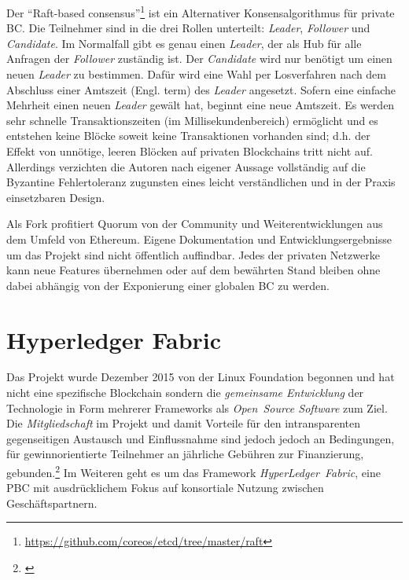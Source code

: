 
Der \enquote{Raft-based consensus}\footnote{\url{https://github.com/coreos/etcd/tree/master/raft}} ist ein Alternativer Konsensalgorithmus für private \gls{BC}. Die Teilnehmer sind in die drei Rollen unterteilt:
\emph{Leader}, \emph{Follower} und \emph{Candidate}. Im Normalfall gibt es genau einen \emph{Leader}, der als Hub für alle Anfragen der \emph{Follower} zuständig ist.
Der \emph{Candidate} wird nur benötigt um einen neuen \emph{Leader} zu bestimmen.
Dafür wird eine Wahl per Losverfahren nach dem Abschluss einer Amtszeit (Engl. term) des \emph{Leader} angesetzt.
Sofern eine einfache Mehrheit einen neuen \emph{Leader} gewält hat, beginnt eine neue Amtszeit.
Es werden sehr schnelle Transaktionszeiten (im Millisekundenbereich) ermöglicht und es entstehen keine Blöcke soweit keine Transaktionen vorhanden sind;
d.h. der Effekt von unnötige, leeren Blöcken auf privaten Blockchains tritt nicht auf.
Allerdings verzichten die Autoren nach eigener Aussage vollständig auf die Byzantine Fehlertoleranz zugunsten eines leicht verständlichen und in der Praxis einsetzbaren Design. 

Als Fork profitiert Quorum von der Community und Weiterentwicklungen aus dem Umfeld von Ethereum.
Eigene Dokumentation und Entwicklungsergebnisse um das Projekt sind nicht öffentlich auffindbar. 
Jedes der privaten Netzwerke kann neue Features übernehmen oder auf dem bewährten Stand bleiben
ohne dabei abhängig von der Exponierung einer globalen \gls{BC} zu werden.

\section{Hyperledger Fabric}\label{impl:hyperledger}

Das Projekt wurde Dezember 2015 von der Linux Foundation begonnen und hat nicht eine spezifische Blockchain sondern die \emph{gemeinsame Entwicklung} der Technologie in Form mehrerer Frameworks als \emph{Open~Source Software} zum Ziel.
Die \emph{Mitgliedschaft} im Projekt und damit Vorteile für den intransparenten gegenseitigen Austausch und Einflussnahme sind jedoch jedoch an Bedingungen, für gewinnorientierte Teilnehmer an jährliche Gebühren zur Finanzierung, gebunden.\footnote{\cite{w:hyperledger:membership}}
Im Weiteren geht es um das Framework \emph{HyperLedger~Fabric}, eine \gls{PBC} mit ausdrücklichem Fokus auf konsortiale Nutzung zwischen Geschäftspartnern.


